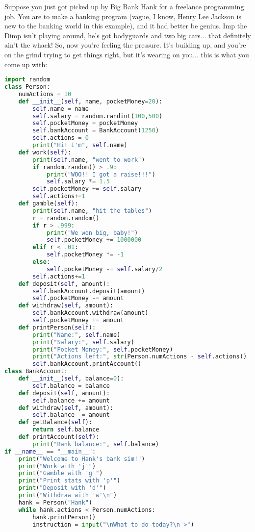 \documentclass[11pt, twoside, reqno]{book}
\begin{document}
Suppose you just got picked up by Big Bank Hank for a freelance programming job. You are to make a banking program (vague, I know, Henry Lee Jackson is new to the banking world in this example), and it had better be genius. Imp the Dimp isn't playing around, he's got bodyguards and two big cars... that definitely ain't the whack! So, now you're feeling the pressure. It's building up, and you're on the grind trying to get things right, but it's wearing on you... this is what you come up with:
\begin{lstlisting}[language=Python]
import random
class Person:
    numActions = 10
    def __init__(self, name, pocketMoney=20):
        self.name = name
        self.salary = random.randint(100,500)
        self.pocketMoney = pocketMoney
        self.bankAccount = BankAccount(1250)
        self.actions = 0
        print("Hi! I'm", self.name)
    def work(self):
        print(self.name, "went to work")
        if random.random() > .9:
            print("WOO!! I got a raise!!!")
            self.salary *= 1.5
        self.pocketMoney += self.salary
        self.actions+=1
    def gamble(self):
        print(self.name, "hit the tables")
        r = random.random()
        if r > .999:
            print("We won big, baby!")
            self.pocketMoney += 1000000
        elif r < .01:
            self.pocketMoney *= -1
        else: 
            self.pocketMoney -= self.salary/2
        self.actions+=1
    def deposit(self, amount):
        self.bankAccount.deposit(amount)
        self.pocketMoney -= amount
    def withdraw(self, amount):
        self.bankAccount.withdraw(amount)
        self.pocketMoney += amount
    def printPerson(self):
        print("Name:", self.name)
        print("Salary:", self.salary)
        print("Pocket Money:", self.pocketMoney)
        print("Actions left:", str(Person.numActions - self.actions))
        self.bankAccount.printAccount()
class BankAccount:
    def __init__(self, balance=0):
        self.balance = balance
    def deposit(self, amount):
        self.balance += amount
    def withdraw(self, amount):
        self.balance -= amount
    def getBalance(self):
        return self.balance
    def printAccount(self):
        print("Bank balance:", self.balance)
if __name__ == "__main__":
    print("Welcome to Hank's bank sim!")
    print("Work with 'j'")
    print("Gamble with 'g'")
    print("Print stats with 'p'")
    print("Deposit with 'd'")
    print("Withdraw with 'w'\n")
    hank = Person("Hank")
    while hank.actions < Person.numActions:
        hank.printPerson()
        instruction = input("\nWhat to do today?\n >")

\end{lstlisting}
\end{document}
